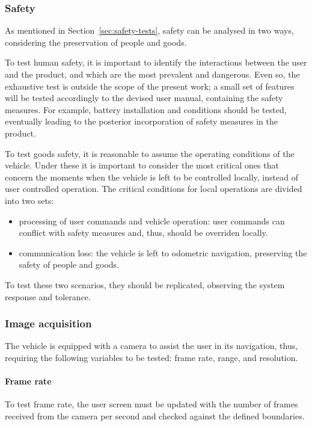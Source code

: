 \subsubsection{Safety}%
\label{sec:orgf4c025f}
As mentioned in Section~\ref{sec:safety-tests}, safety can be analysed in two
ways, considering the preservation of people and goods.

To test human safety, it is important to identify the interactions between the
user and the product, and which are the most prevalent and dangerous. Even so,
the exhaustive test is outside the scope of the present work; a small set of
features will be tested accordingly to the devised user manual, containing the
safety measures. For example, battery installation and conditions should be
tested, eventually leading to the posterior incorporation of safety measures in
the product.

To test goods safety, it is reasonable to assume the operating conditions of the
vehicle. Under these it is important to consider the most critical ones that
concern the moments when the vehicle is left to be controlled locally, instead
of user controlled operation. The critical conditions for local operations are
divided into two sets:
\begin{itemize}
\item processing of user commands and vehicle operation: user commands can
  conflict with safety measures and, thus, should be overriden locally.
\item communication loss: the vehicle is left to odometric navigation,
  preserving the safety of people and goods.
\end{itemize}
To test these two scenarios, they should be replicated, observing the system
response and tolerance.

\subsubsection{Image acquisition}%
\label{sec:orgb1f5c2a}
The vehicle is equipped with a camera to assist the user in its navigation,
thus, requiring the following variables to be tested: frame rate, range, and resolution.

\paragraph{Frame rate}%
\label{sec:frame-rate-test}
To test frame rate, the user screen must be updated with the number of frames
received from the camera per second and checked against the defined boundaries.

